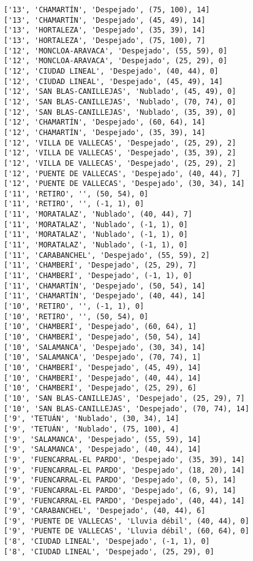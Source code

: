 \documentclass[11pt]{article}
\begin{document}
\begin{Verbatim}[commandchars=\\\{\}]
['13', 'CHAMARTÍN', 'Despejado', (75, 100), 14]
['13', 'CHAMARTÍN', 'Despejado', (45, 49), 14]
['13', 'HORTALEZA', 'Despejado', (35, 39), 14]
['13', 'HORTALEZA', 'Despejado', (75, 100), 7]
['12', 'MONCLOA-ARAVACA', 'Despejado', (55, 59), 0]
['12', 'MONCLOA-ARAVACA', 'Despejado', (25, 29), 0]
['12', 'CIUDAD LINEAL', 'Despejado', (40, 44), 0]
['12', 'CIUDAD LINEAL', 'Despejado', (45, 49), 14]
['12', 'SAN BLAS-CANILLEJAS', 'Nublado', (45, 49), 0]
['12', 'SAN BLAS-CANILLEJAS', 'Nublado', (70, 74), 0]
['12', 'SAN BLAS-CANILLEJAS', 'Nublado', (35, 39), 0]
['12', 'CHAMARTÍN', 'Despejado', (60, 64), 14]
['12', 'CHAMARTÍN', 'Despejado', (35, 39), 14]
['12', 'VILLA DE VALLECAS', 'Despejado', (25, 29), 2]
['12', 'VILLA DE VALLECAS', 'Despejado', (35, 39), 2]
['12', 'VILLA DE VALLECAS', 'Despejado', (25, 29), 2]
['12', 'PUENTE DE VALLECAS', 'Despejado', (40, 44), 7]
['12', 'PUENTE DE VALLECAS', 'Despejado', (30, 34), 14]
['11', 'RETIRO', '', (50, 54), 0]
['11', 'RETIRO', '', (-1, 1), 0]
['11', 'MORATALAZ', 'Nublado', (40, 44), 7]
['11', 'MORATALAZ', 'Nublado', (-1, 1), 0]
['11', 'MORATALAZ', 'Nublado', (-1, 1), 0]
['11', 'MORATALAZ', 'Nublado', (-1, 1), 0]
['11', 'CARABANCHEL', 'Despejado', (55, 59), 2]
['11', 'CHAMBERÍ', 'Despejado', (25, 29), 7]
['11', 'CHAMBERÍ', 'Despejado', (-1, 1), 0]
['11', 'CHAMARTÍN', 'Despejado', (50, 54), 14]
['11', 'CHAMARTÍN', 'Despejado', (40, 44), 14]
['10', 'RETIRO', '', (-1, 1), 0]
['10', 'RETIRO', '', (50, 54), 0]
['10', 'CHAMBERÍ', 'Despejado', (60, 64), 1]
['10', 'CHAMBERÍ', 'Despejado', (50, 54), 14]
['10', 'SALAMANCA', 'Despejado', (30, 34), 14]
['10', 'SALAMANCA', 'Despejado', (70, 74), 1]
['10', 'CHAMBERÍ', 'Despejado', (45, 49), 14]
['10', 'CHAMBERÍ', 'Despejado', (40, 44), 14]
['10', 'CHAMBERÍ', 'Despejado', (25, 29), 6]
['10', 'SAN BLAS-CANILLEJAS', 'Despejado', (25, 29), 7]
['10', 'SAN BLAS-CANILLEJAS', 'Despejado', (70, 74), 14]
['9', 'TETUÁN', 'Nublado', (30, 34), 14]
['9', 'TETUÁN', 'Nublado', (75, 100), 4]
['9', 'SALAMANCA', 'Despejado', (55, 59), 14]
['9', 'SALAMANCA', 'Despejado', (40, 44), 14]
['9', 'FUENCARRAL-EL PARDO', 'Despejado', (35, 39), 14]
['9', 'FUENCARRAL-EL PARDO', 'Despejado', (18, 20), 14]
['9', 'FUENCARRAL-EL PARDO', 'Despejado', (0, 5), 14]
['9', 'FUENCARRAL-EL PARDO', 'Despejado', (6, 9), 14]
['9', 'FUENCARRAL-EL PARDO', 'Despejado', (40, 44), 14]
['9', 'CARABANCHEL', 'Despejado', (40, 44), 6]
['9', 'PUENTE DE VALLECAS', 'Lluvia débil', (40, 44), 0]
['9', 'PUENTE DE VALLECAS', 'Lluvia débil', (60, 64), 0]
['8', 'CIUDAD LINEAL', 'Despejado', (-1, 1), 0]
['8', 'CIUDAD LINEAL', 'Despejado', (25, 29), 0]

\end{Verbatim}
\end{document}

